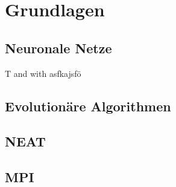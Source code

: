 \chapter{Grundlagen}
\section{Neuronale Netze}
\ac{T} and \cite{stanley2002evolving} with \citeauthor{stanley2002evolving}
\newpage
asfkajsfö
\section{Evolutionäre Algorithmen}
\section{NEAT}
\section{MPI}